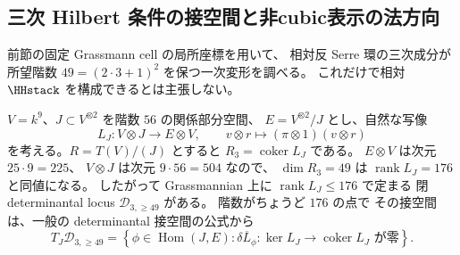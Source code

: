 \subsection{三次 Hilbert 条件の接空間と非cubic表示の法方向}
\label{subsec:noncubic-tangent-degree-three}

前節の固定 Grassmann cell の局所座標を用いて、
相対反 Serre 環の三次成分が所望階数
$49=(2\cdot3+1)^2$ を保つ一次変形を調べる。
これだけで相対 $\HHstack$ を構成できるとは主張しない。

$V=k^9$、$J\subset V^{\otimes2}$ を階数 $56$ の関係部分空間、
$E=V^{\otimes2}/J$ とし、自然な写像
\[
 L_J:V\otimes J\longrightarrow E\otimes V,\qquad
 v\otimes r\longmapsto(\pi\otimes1)(v\otimes r)
 \tag{H3-L}\label{eq:noncubic-degree-three-relation-map}
\]
を考える。$R=T(V)/(J)$ とすると
$R_3=\operatorname{coker}L_J$ である。
$E\otimes V$ は次元 $25\cdot9=225$、
$V\otimes J$ は次元 $9\cdot56=504$ なので、
$\dim R_3=49$ は $\operatorname{rank}L_J=176$ と同値になる。
したがって Grassmannian 上に
$\operatorname{rank}L_J\le176$ で定まる
閉 determinantal locus $\mathcal D_{3,\ge49}$ がある。
階数がちょうど $176$ の点で
その接空間は、一般の determinantal 接空間の公式から
\[
 T_J\mathcal D_{3,\ge49}
 =\left\{
 \phi\in\operatorname{Hom}(J,E):
 \overline{\delta L_\phi}:
   \ker L_J\to\operatorname{coker}L_J
 \text{ が零}
 \right\}.
 \tag{H3-T}\label{eq:noncubic-third-degree-tangent}
\]


